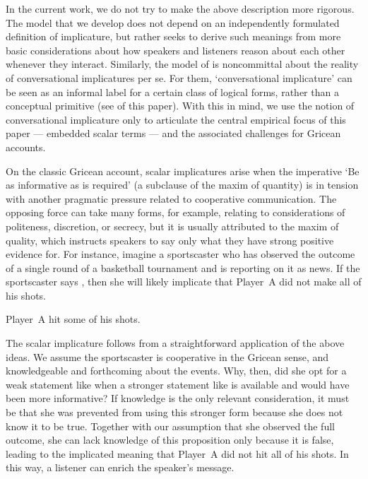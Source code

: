 \documentclass[leqno,12pt]{article}
\begin{document}
In the current work, we do not try to make the above description more
rigorous. The model that we develop does not depend on an
independently formulated definition of implicature, but rather seeks
to derive such meanings from more basic considerations about how
speakers and listeners reason about each other whenever they
interact. Similarly, the model of \citet{ChierchiaFoxSpector08} is
noncommittal about the reality of conversational implicatures per
se. For them, `conversational implicature' can be seen as an informal
label for a certain class of logical forms, rather than a conceptual
primitive (see  of this paper). With this in
mind, we use the notion of conversational implicature only to
articulate the central empirical focus of this paper --- embedded
scalar terms --- and the associated challenges for Gricean accounts.

On the classic Gricean account, scalar implicatures arise when the
imperative `Be as informative as is required' (a subclause of the
maxim of quantity) is in tension with another pragmatic pressure
related to cooperative communication. The opposing force can take many
forms, for example, relating to considerations of politeness,
discretion, or secrecy, but it is usually attributed to the maxim of
quality, which instructs speakers to say only what they have strong
positive evidence for. For instance, imagine a sportscaster who has
observed the outcome of a single round of a basketball tournament and
is reporting on it as news. If the sportscaster says , then
she will likely implicate that Player~A did not make all of his shots.
%
\begin{examples}
\item\label{some} Player~A hit some of his shots.
\end{examples}

The scalar implicature follows from a straightforward application of
the above ideas. We assume the sportscaster is cooperative in the
Gricean sense, and knowledgeable and forthcoming about the
events. Why, then, did she opt for a weak statement like
 when a stronger statement like
 is available and would have been
more informative?  If knowledge is the only relevant consideration, it
must be that she was prevented from using this stronger form because
she does not know it to be true. Together with our assumption that she
observed the full outcome, she can lack knowledge of this proposition
only because it is false, leading to the implicated meaning that
Player~A did not hit all of his shots. In this way, a listener can
enrich the speaker's message.
\end{document}
